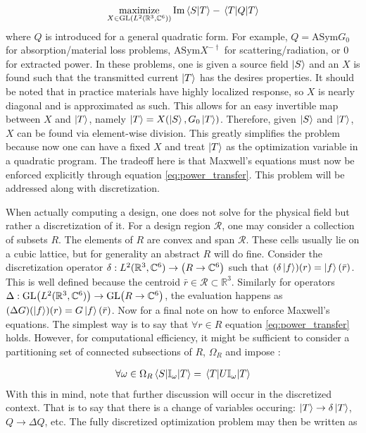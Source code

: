 \documentclass[twocolumn]{revtex4-2}
\DeclareMathOperator*{\maximize}{maximize}
\begin{document}
\begin{align}
	\maximize_{X\in\text{GL}\qty(L^2\qty(\mathbb{R}^3, \mathbb{C}^6))} \Im\braket{S}{T} - \ev{Q}{T}
\end{align}
where $Q$ is introduced for a general quadratic form. For example, $Q=\text{ASym}G_0$ for absorption/material loss problems, $\text{ASym}X^{-\dagger}$ for scattering/radiation, or $0$ for extracted power\cite{molesky2020global}. In these problems, one is given a source field $\ket{S}$ and an $X$ is found such that the transmitted current $\ket{T}$ has the desires properties. It should be noted that in practice materials have highly localized response, so $X$ is nearly diagonal and is approximated as such. This allows for an easy invertible map between $X$ and $\ket{T}$, namely $\ket{T} = X\qty(\ket{S}, G_0\ket{T})$. Therefore, given $\ket{S}$ and $\ket{T}$, $X$ can be found via element-wise division. This greatly simplifies the problem because now one can have a fixed $X$ and treat $\ket{T}$ as the optimization variable in a quadratic program. The tradeoff here is that Maxwell's equations must now be enforced explicitly through equation \ref{eq:power_transfer}. This problem will be addressed along with discretization.

When actually computing a design, one does not solve for the physical field but rather a discretization of it. For a design region $\mathcal{R}$, one may consider a collection of subsets $R$. The elements of $R$ are convex and span $\mathcal{R}$. These cells usually lie on a cubic lattice, but for generality an abstract $R$ will do fine. Consider the discretization operator $\delta:L^2(\mathbb{R}^3, \mathbb{C}^6)\rightarrow\qty(R\rightarrow\mathbb{C}^6)$ such that $(\delta\ket{f})(r) = \ket{f}(\bar{r})$. This is well defined because the centroid $\bar{r}\in\mathcal{R}\subset\mathbb{R}^3$. Similarly for operators $\Delta:\text{GL}\qty(L^2(\mathbb{R}^3, \mathbb{C}^6))\rightarrow\text{GL}\qty(R\rightarrow\mathbb{C}^6)$, the evaluation happens as $(\Delta G)(\ket{f})(r)=G\ket{f}(\bar{r})$. Now for a final note on how to enforce Maxwell's equations. The simplest way is to say that $\forall r\in R$ equation \ref{eq:power_transfer} holds. However, for computational efficiency, it might be sufficient to consider a partitioning set of connected subsections of $R$, $\Omega_R$ and impose \cite{molesky2020hierarchical}:

\begin{align}
	\forall \omega\in\Omega_R \mel{S}{\mathbb{I}_\omega}{T} = \ev{U\mathbb{I}_\omega}{T}
\end{align}
With this in mind, note that further discussion will occur in the discretized context. That is to say that there is a change of variables occuring: $\ket{T}\rightarrow\delta\ket{T}$, $Q\rightarrow\Delta Q$, etc. The fully discretized optimization problem may then be written as
\end{document}
